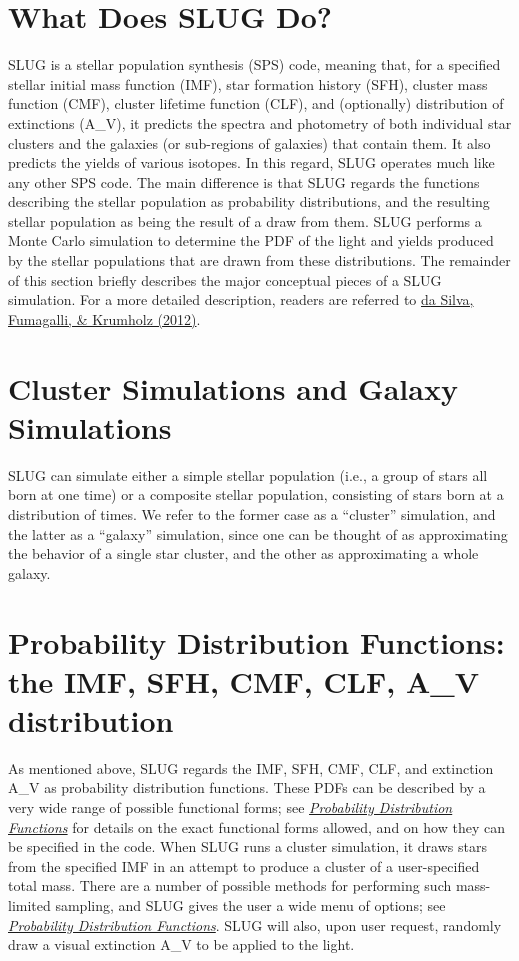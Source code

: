 \documentclass[letterpaper,10pt,english]{sphinxmanual}
\begin{document}
\section{What Does SLUG Do?}
\label{intro:what-does-slug-do}
SLUG is a stellar population synthesis (SPS) code, meaning that, for a specified stellar initial mass function (IMF), star formation history (SFH), cluster mass function (CMF), cluster lifetime function (CLF), and (optionally) distribution of extinctions (A\_V), it predicts the spectra and photometry of both individual star clusters and the galaxies (or sub-regions of galaxies) that contain them. It also predicts the yields of various isotopes. In this regard, SLUG operates much like any other SPS code. The main difference is that SLUG regards the functions describing the stellar population as probability distributions, and the resulting stellar population as being the result of a draw from them. SLUG performs a Monte Carlo simulation to determine the PDF of the light and yields produced by the stellar populations that are drawn from these distributions. The remainder of this section briefly describes the major conceptual pieces of a SLUG simulation. For a more detailed description, readers are referred to \href{http://adsabs.harvard.edu/abs/2012ApJ...745..145D}{da Silva, Fumagalli, \& Krumholz (2012)}.


\section{Cluster Simulations and Galaxy Simulations}
\label{intro:cluster-simulations-and-galaxy-simulations}
SLUG can simulate either a simple stellar population (i.e., a group of stars all born at one time) or a composite stellar population, consisting of stars born at a distribution of times. We refer to the former case as a ``cluster'' simulation, and the latter as a ``galaxy'' simulation, since one can be thought of as approximating the behavior of a single star cluster, and the other as approximating a whole galaxy.


\section{Probability Distribution Functions: the IMF, SFH, CMF, CLF, A\_V distribution}
\label{intro:probability-distribution-functions-the-imf-sfh-cmf-clf-a-v-distribution}\label{intro:ssec-slugpdfs}
As mentioned above, SLUG regards the IMF, SFH, CMF, CLF, and extinction A\_V as probability distribution functions. These PDFs can be described by a very wide range of possible functional forms; see {\hyperref[pdfs:sec\string-pdfs]{\emph{Probability Distribution Functions}}} for details on the exact functional forms allowed, and on how they can be specified in the code. When SLUG runs a cluster simulation, it draws stars from the specified IMF in an attempt to produce a cluster of a user-specified total mass. There are a number of possible methods for performing such mass-limited sampling, and SLUG gives the user a wide menu of options; see {\hyperref[pdfs:sec\string-pdfs]{\emph{Probability Distribution Functions}}}. SLUG will also, upon user request, randomly draw a visual extinction A\_V to be applied to the light.
\end{document}

